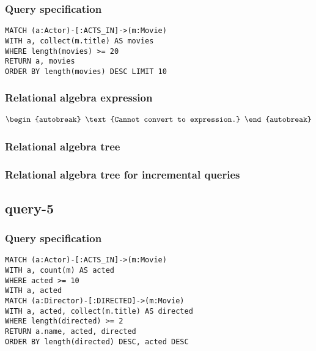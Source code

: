 \subsubsection*{Query specification}

\begin{lstlisting}
MATCH (a:Actor)-[:ACTS_IN]->(m:Movie)
WITH a, collect(m.title) AS movies
WHERE length(movies) >= 20
RETURN a, movies
ORDER BY length(movies) DESC LIMIT 10
\end{lstlisting}

\subsubsection*{Relational algebra expression}

\begin{align*}
\begin{autobreak}
\text{Cannot convert to expression.}
\end{autobreak}
\end{align*}

\subsubsection*{Relational algebra tree}


\subsubsection*{Relational algebra tree for incremental queries}

\subsection{query-5}

\subsubsection*{Query specification}

\begin{lstlisting}
MATCH (a:Actor)-[:ACTS_IN]->(m:Movie)
WITH a, count(m) AS acted
WHERE acted >= 10
WITH a, acted
MATCH (a:Director)-[:DIRECTED]->(m:Movie)
WITH a, acted, collect(m.title) AS directed
WHERE length(directed) >= 2
RETURN a.name, acted, directed
ORDER BY length(directed) DESC, acted DESC
\end{lstlisting}

